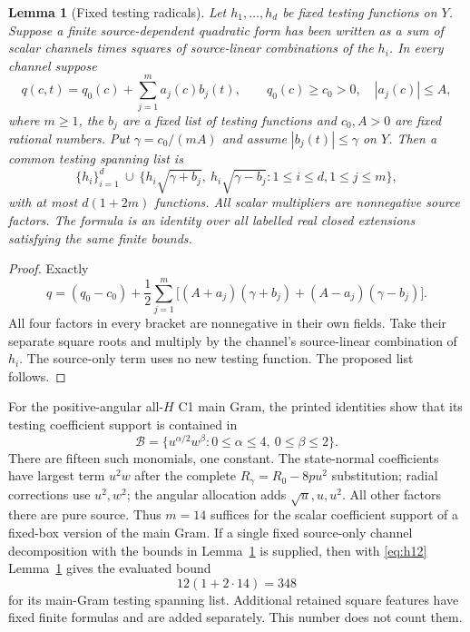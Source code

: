\documentclass[11pt]{article}
\newtheorem{lemma}[proposition]{Lemma}
\begin{document}
\begin{lemma}[Fixed testing radicals]\label{lem:box}
Let $h_1,\ldots,h_d$ be fixed testing functions on $Y$.
Suppose a finite source-dependent quadratic form has been written
as a sum of scalar channels times squares of source-linear
combinations of the $h_i$. In every channel suppose
\[
 q(c,t)=q_0(c)+\sum_{j=1}^{m}a_j(c)b_j(t),\qquad
 q_0(c)\ge c_0>0,\quad |a_j(c)|\le A,
\]
where $m\ge1$, the $b_j$ are a fixed list of testing functions and
$c_0,A>0$ are fixed rational numbers. Put
$\gamma=c_0/(mA)$ and assume $|b_j(t)|\le\gamma$ on $Y$.
Then a common testing spanning list is
\[
 \{h_i\}_{i=1}^d\ \cup\
 \{h_i\sqrt{\gamma+b_j},\ h_i\sqrt{\gamma-b_j}:
                     1\le i\le d, 1\le j\le m\},
\]
with at most $d(1+2m)$ functions. All scalar multipliers are
nonnegative source factors. The formula is an identity over all
labelled real closed extensions satisfying the same finite bounds.
\end{lemma}
\begin{proof}
Exactly
\[
 q=(q_0-c_0)+\frac12\sum_{j=1}^{m}
 \bigl[(A+a_j)(\gamma+b_j)+(A-a_j)(\gamma-b_j)\bigr].
\]
All four factors in every bracket are nonnegative in their own
fields. Take their separate square roots and multiply by the
channel's source-linear combination of $h_i$. The source-only
term uses no new testing function. The proposed list follows.
\end{proof}

For the positive-angular all-$H$ C1 main Gram, the printed
identities show that its testing coefficient support is contained
in
\[
 \mathcal B=\{u^{\alpha/2}w^\beta:
                  0\le\alpha\le4,\ 0\le\beta\le2\}.
\]
There are fifteen such monomials, one constant. The state-normal
coefficients have largest term $u^2w$ after the complete
$R_\gamma=R_0-8pu^2$ substitution; radial corrections use
$u^2,w^2$; the angular allocation adds $\sqrt u,u,u^2$.
All other factors there are pure source. Thus $m=14$ suffices
for the scalar coefficient support of a fixed-box version of
the main Gram. If a single fixed source-only channel decomposition
with the bounds in Lemma~\ref{lem:box} is supplied, then with
\eqref{eq:h12} Lemma~\ref{lem:box} gives the evaluated bound
\[
                       12(1+2\cdot14)=348
\]
for its main-Gram testing spanning list. Additional retained
square features have fixed finite formulas and are added
separately. This number does not count them.
\end{document}
